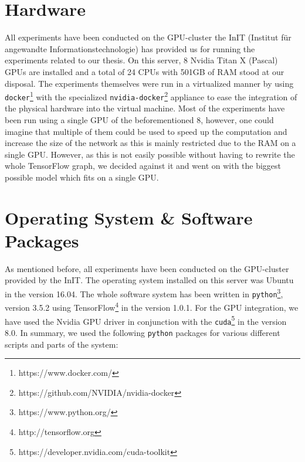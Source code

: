 \section{Hardware}
\label{software_system:hardware}
All experiments have been conducted on the GPU-cluster the InIT (Institut für angewandte Informationstechnologie) has provided us for running the experiments related to our thesis. On this server, 8 Nvidia Titan X (Pascal) GPUs are installed and a total of 24 CPUs with 501GB of RAM stood at our disposal. The experiments themselves were run in a virtualized manner by using \texttt{docker}\footnote{https://www.docker.com/} with the specialized \texttt{nvidia-docker}\footnote{https://github.com/NVIDIA/nvidia-docker} appliance to ease the integration of the physical hardware into the virtual machine. Most of the experiments have been run using a single GPU of the beforementioned 8, however, one could imagine that multiple of them could be used to speed up the computation and increase the size of the network as this is mainly restricted due to the RAM on a single GPU. However, as this is not easily possible without having to rewrite the whole TensorFlow graph, we decided against it and went on with the biggest possible model which fits on a single GPU.

\section{Operating System \& Software Packages}
\label{software_system:software_packages}
As mentioned before, all experiments have been conducted on the GPU-cluster provided by the InIT. The operating system installed on this server was Ubuntu in the version 16.04. The whole software system has been written in \texttt{python}\footnote{https://www.python.org/}, version 3.5.2 using TensorFlow\footnote{http://tensorflow.org} in the version 1.0.1. For the GPU integration, we have used the Nvidia GPU driver in conjunction with the \texttt{cuda}\footnote{https://developer.nvidia.com/cuda-toolkit} in the version 8.0. In summary, we used the following \texttt{python} packages for various different scripts and parts of the system:

